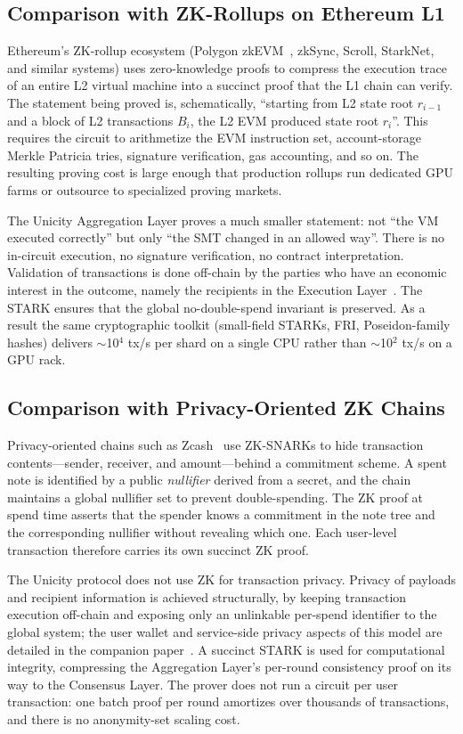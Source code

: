 \documentclass[11pt]{article}
\begin{document}
\subsection{Comparison with ZK-Rollups on Ethereum L1}

Ethereum's ZK-rollup ecosystem (Polygon zkEVM~\cite{polygonzkevm}, zkSync, Scroll, StarkNet, and similar systems) uses zero-knowledge proofs to compress the execution trace of an entire L2 virtual machine into a succinct proof that the L1 chain can verify. The statement being proved is, schematically, ``starting from L2 state root $r_{i-1}$ and a block of L2 transactions $B_i$, the L2 EVM produced state root $r_i$''. This requires the circuit to arithmetize the EVM instruction set, account-storage Merkle Patricia tries, signature verification, gas accounting, and so on. The resulting proving cost is large enough that production rollups run dedicated GPU farms or outsource to specialized proving markets.

The Unicity Aggregation Layer proves a much smaller statement: not ``the VM executed correctly'' but only ``the SMT changed in an allowed way''. There is no in-circuit execution, no signature verification, no contract interpretation. Validation of transactions is done off-chain by the parties who have an economic interest in the outcome, namely the recipients in the Execution Layer~\cite{exemodel}. The STARK ensures that the global no-double-spend invariant is preserved. As a result the same cryptographic toolkit (small-field STARKs, FRI, Poseidon-family hashes) delivers $\sim$10$^4$ tx/s per shard on a single CPU rather than $\sim$10$^2$ tx/s on a GPU rack.

\subsection{Comparison with Privacy-Oriented ZK Chains}

Privacy-oriented chains such as Zcash~\cite{zerocash} use ZK-SNARKs to hide transaction contents---sender, receiver, and amount---behind a commitment scheme. A spent note is identified by a public \emph{nullifier} derived from a secret, and the chain maintains a global nullifier set to prevent double-spending. The ZK proof at spend time asserts that the spender knows a commitment in the note tree and the corresponding nullifier without revealing which one. Each user-level transaction therefore carries its own succinct ZK proof.

The Unicity protocol does not use ZK for transaction privacy. Privacy of payloads and recipient information is achieved structurally, by keeping transaction execution off-chain and exposing only an unlinkable per-spend identifier to the global system; the user wallet and service-side privacy aspects of this model are detailed in the companion paper~\cite{exemodel}. A succinct STARK is used for computational integrity, compressing the Aggregation Layer's per-round consistency proof on its way to the Consensus Layer. The prover does not run a circuit per user transaction: one batch proof per round amortizes over thousands of transactions, and there is no anonymity-set scaling cost.
\end{document}
